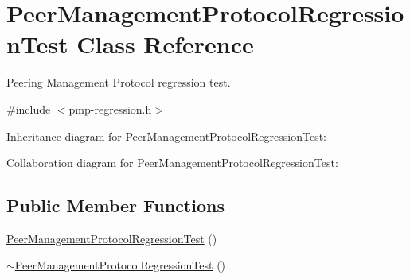 \hypertarget{classPeerManagementProtocolRegressionTest}{}\section{Peer\+Management\+Protocol\+Regression\+Test Class Reference}
\label{classPeerManagementProtocolRegressionTest}


Peering Management Protocol regression test.  




{\ttfamily \#include $<$pmp-\/regression.\+h$>$}



Inheritance diagram for Peer\+Management\+Protocol\+Regression\+Test\+:


Collaboration diagram for Peer\+Management\+Protocol\+Regression\+Test\+:
\subsection*{Public Member Functions}
\begin{DoxyCompactItemize}
\item 
\hyperlink{classPeerManagementProtocolRegressionTest_a6614db451c1f60281dcccdfe26417519}{Peer\+Management\+Protocol\+Regression\+Test} ()
\item 
\hyperlink{classPeerManagementProtocolRegressionTest_a7520a1f5a92c738efe82b57c603c892a}{$\sim$\+Peer\+Management\+Protocol\+Regression\+Test} ()
\end{DoxyCompactItemize}

